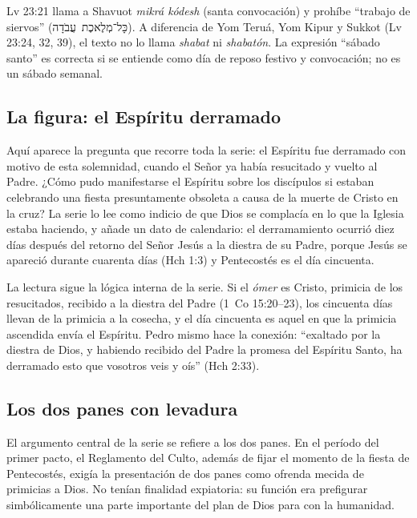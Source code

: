 \documentclass[11pt,letterpaper]{article}
\newcommand{\heb}[1]{\mbox{\foreignlanguage{hebrew}{#1}}}
\begin{document}
\begin{nota}
Lv 23:21 llama a Shavuot \emph{mikrá kódesh} (santa convocación) y prohíbe ``trabajo de siervos'' (\heb{כָּל־מְלֶאכֶת עֲבֹדָה}). A diferencia de Yom Teruá, Yom Kipur y Sukkot (Lv 23:24, 32, 39), el texto no lo llama \emph{shabat} ni \emph{shabatón}. La expresión ``sábado santo'' es correcta si se entiende como día de reposo festivo y convocación; no es un sábado semanal.
\end{nota}

\subsection{La figura: el Espíritu derramado}

Aquí aparece la pregunta que recorre toda la serie: el Espíritu fue derramado con motivo de esta solemnidad, cuando el Señor ya había resucitado y vuelto al Padre. ¿Cómo pudo manifestarse el Espíritu sobre los discípulos si estaban celebrando una fiesta presuntamente obsoleta a causa de la muerte de Cristo en la cruz? La serie lo lee como indicio de que Dios se complacía en lo que la Iglesia estaba haciendo, y añade un dato de calendario: el derramamiento ocurrió diez días después del retorno del Señor Jesús a la diestra de su Padre, porque Jesús se apareció durante cuarenta días (Hch 1:3) y Pentecostés es el día cincuenta.

La lectura sigue la lógica interna de la serie. Si el \emph{ómer} es Cristo, primicia de los resucitados, recibido a la diestra del Padre (1~Co 15:20--23), los cincuenta días llevan de la primicia a la cosecha, y el día cincuenta es aquel en que la primicia ascendida envía el Espíritu. Pedro mismo hace la conexión: ``exaltado por la diestra de Dios, y habiendo recibido del Padre la promesa del Espíritu Santo, ha derramado esto que vosotros veis y oís'' (Hch 2:33).

\subsection{Los dos panes con levadura}

El argumento central de la serie se refiere a los dos panes. En el período del primer pacto, el Reglamento del Culto, además de fijar el momento de la fiesta de Pentecostés, exigía la presentación de dos panes como ofrenda mecida de primicias a Dios. No tenían finalidad expiatoria: su función era prefigurar simbólicamente una parte importante del plan de Dios para con la humanidad.
\end{document}

